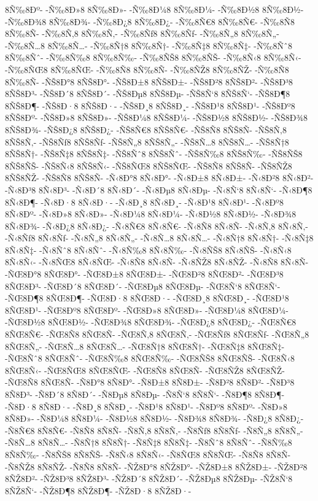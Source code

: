 {8Ñ‰8Ðº-
-Ñ‰8Ð»8
8Ñ‰8Ð»-
-Ñ‰8Ð¼8
8Ñ‰8Ð¼-
-Ñ‰8Ð½8
8Ñ‰8Ð½-
-Ñ‰8Ð¾8
8Ñ‰8Ð¾-
-Ñ‰8Ð¿8
8Ñ‰8Ð¿-
-Ñ‰8Ñ€8
8Ñ‰8Ñ€-
-Ñ‰8Ñ8
8Ñ‰8Ñ-
-Ñ‰8Ñ‚8
8Ñ‰8Ñ‚-
-Ñ‰8Ñƒ8
8Ñ‰8Ñƒ-
-Ñ‰8Ñ„8
8Ñ‰8Ñ„-
-Ñ‰8Ñ…8
8Ñ‰8Ñ…-
-Ñ‰8Ñ†8
8Ñ‰8Ñ†-
-Ñ‰8Ñ‡8
8Ñ‰8Ñ‡-
-Ñ‰8Ñˆ8
8Ñ‰8Ñˆ-
-Ñ‰8Ñ‰8
8Ñ‰8Ñ‰-
-Ñ‰8ÑŠ8
8Ñ‰8ÑŠ-
-Ñ‰8Ñ‹8
8Ñ‰8Ñ‹-
-Ñ‰8ÑŒ8
8Ñ‰8ÑŒ-
-Ñ‰8Ñ8
8Ñ‰8Ñ-
-Ñ‰8ÑŽ8
8Ñ‰8ÑŽ-
-Ñ‰8Ñ8
8Ñ‰8Ñ-
-ÑŠ8Ð°8
8ÑŠ8Ð°-
-ÑŠ8Ð±8
8ÑŠ8Ð±-
-ÑŠ8Ð²8
8ÑŠ8Ð²-
-ÑŠ8Ð³8
8ÑŠ8Ð³-
-ÑŠ8Ð´8
8ÑŠ8Ð´-
-ÑŠ8Ðµ8
8ÑŠ8Ðµ-
-ÑŠ8Ñ‘8
8ÑŠ8Ñ‘-
-ÑŠ8Ð¶8
8ÑŠ8Ð¶-
-ÑŠ8Ð·8
8ÑŠ8Ð·-
-ÑŠ8Ð¸8
8ÑŠ8Ð¸-
-ÑŠ8Ð¹8
8ÑŠ8Ð¹-
-ÑŠ8Ðº8
8ÑŠ8Ðº-
-ÑŠ8Ð»8
8ÑŠ8Ð»-
-ÑŠ8Ð¼8
8ÑŠ8Ð¼-
-ÑŠ8Ð½8
8ÑŠ8Ð½-
-ÑŠ8Ð¾8
8ÑŠ8Ð¾-
-ÑŠ8Ð¿8
8ÑŠ8Ð¿-
-ÑŠ8Ñ€8
8ÑŠ8Ñ€-
-ÑŠ8Ñ8
8ÑŠ8Ñ-
-ÑŠ8Ñ‚8
8ÑŠ8Ñ‚-
-ÑŠ8Ñƒ8
8ÑŠ8Ñƒ-
-ÑŠ8Ñ„8
8ÑŠ8Ñ„-
-ÑŠ8Ñ…8
8ÑŠ8Ñ…-
-ÑŠ8Ñ†8
8ÑŠ8Ñ†-
-ÑŠ8Ñ‡8
8ÑŠ8Ñ‡-
-ÑŠ8Ñˆ8
8ÑŠ8Ñˆ-
-ÑŠ8Ñ‰8
8ÑŠ8Ñ‰-
-ÑŠ8ÑŠ8
8ÑŠ8ÑŠ-
-ÑŠ8Ñ‹8
8ÑŠ8Ñ‹-
-ÑŠ8ÑŒ8
8ÑŠ8ÑŒ-
-ÑŠ8Ñ8
8ÑŠ8Ñ-
-ÑŠ8ÑŽ8
8ÑŠ8ÑŽ-
-ÑŠ8Ñ8
8ÑŠ8Ñ-
-Ñ‹8Ð°8
8Ñ‹8Ð°-
-Ñ‹8Ð±8
8Ñ‹8Ð±-
-Ñ‹8Ð²8
8Ñ‹8Ð²-
-Ñ‹8Ð³8
8Ñ‹8Ð³-
-Ñ‹8Ð´8
8Ñ‹8Ð´-
-Ñ‹8Ðµ8
8Ñ‹8Ðµ-
-Ñ‹8Ñ‘8
8Ñ‹8Ñ‘-
-Ñ‹8Ð¶8
8Ñ‹8Ð¶-
-Ñ‹8Ð·8
8Ñ‹8Ð·-
-Ñ‹8Ð¸8
8Ñ‹8Ð¸-
-Ñ‹8Ð¹8
8Ñ‹8Ð¹-
-Ñ‹8Ðº8
8Ñ‹8Ðº-
-Ñ‹8Ð»8
8Ñ‹8Ð»-
-Ñ‹8Ð¼8
8Ñ‹8Ð¼-
-Ñ‹8Ð½8
8Ñ‹8Ð½-
-Ñ‹8Ð¾8
8Ñ‹8Ð¾-
-Ñ‹8Ð¿8
8Ñ‹8Ð¿-
-Ñ‹8Ñ€8
8Ñ‹8Ñ€-
-Ñ‹8Ñ8
8Ñ‹8Ñ-
-Ñ‹8Ñ‚8
8Ñ‹8Ñ‚-
-Ñ‹8Ñƒ8
8Ñ‹8Ñƒ-
-Ñ‹8Ñ„8
8Ñ‹8Ñ„-
-Ñ‹8Ñ…8
8Ñ‹8Ñ…-
-Ñ‹8Ñ†8
8Ñ‹8Ñ†-
-Ñ‹8Ñ‡8
8Ñ‹8Ñ‡-
-Ñ‹8Ñˆ8
8Ñ‹8Ñˆ-
-Ñ‹8Ñ‰8
8Ñ‹8Ñ‰-
-Ñ‹8ÑŠ8
8Ñ‹8ÑŠ-
-Ñ‹8Ñ‹8
8Ñ‹8Ñ‹-
-Ñ‹8ÑŒ8
8Ñ‹8ÑŒ-
-Ñ‹8Ñ8
8Ñ‹8Ñ-
-Ñ‹8ÑŽ8
8Ñ‹8ÑŽ-
-Ñ‹8Ñ8
8Ñ‹8Ñ-
-ÑŒ8Ð°8
8ÑŒ8Ð°-
-ÑŒ8Ð±8
8ÑŒ8Ð±-
-ÑŒ8Ð²8
8ÑŒ8Ð²-
-ÑŒ8Ð³8
8ÑŒ8Ð³-
-ÑŒ8Ð´8
8ÑŒ8Ð´-
-ÑŒ8Ðµ8
8ÑŒ8Ðµ-
-ÑŒ8Ñ‘8
8ÑŒ8Ñ‘-
-ÑŒ8Ð¶8
8ÑŒ8Ð¶-
-ÑŒ8Ð·8
8ÑŒ8Ð·-
-ÑŒ8Ð¸8
8ÑŒ8Ð¸-
-ÑŒ8Ð¹8
8ÑŒ8Ð¹-
-ÑŒ8Ðº8
8ÑŒ8Ðº-
-ÑŒ8Ð»8
8ÑŒ8Ð»-
-ÑŒ8Ð¼8
8ÑŒ8Ð¼-
-ÑŒ8Ð½8
8ÑŒ8Ð½-
-ÑŒ8Ð¾8
8ÑŒ8Ð¾-
-ÑŒ8Ð¿8
8ÑŒ8Ð¿-
-ÑŒ8Ñ€8
8ÑŒ8Ñ€-
-ÑŒ8Ñ8
8ÑŒ8Ñ-
-ÑŒ8Ñ‚8
8ÑŒ8Ñ‚-
-ÑŒ8Ñƒ8
8ÑŒ8Ñƒ-
-ÑŒ8Ñ„8
8ÑŒ8Ñ„-
-ÑŒ8Ñ…8
8ÑŒ8Ñ…-
-ÑŒ8Ñ†8
8ÑŒ8Ñ†-
-ÑŒ8Ñ‡8
8ÑŒ8Ñ‡-
-ÑŒ8Ñˆ8
8ÑŒ8Ñˆ-
-ÑŒ8Ñ‰8
8ÑŒ8Ñ‰-
-ÑŒ8ÑŠ8
8ÑŒ8ÑŠ-
-ÑŒ8Ñ‹8
8ÑŒ8Ñ‹-
-ÑŒ8ÑŒ8
8ÑŒ8ÑŒ-
-ÑŒ8Ñ8
8ÑŒ8Ñ-
-ÑŒ8ÑŽ8
8ÑŒ8ÑŽ-
-ÑŒ8Ñ8
8ÑŒ8Ñ-
-Ñ8Ð°8
8Ñ8Ð°-
-Ñ8Ð±8
8Ñ8Ð±-
-Ñ8Ð²8
8Ñ8Ð²-
-Ñ8Ð³8
8Ñ8Ð³-
-Ñ8Ð´8
8Ñ8Ð´-
-Ñ8Ðµ8
8Ñ8Ðµ-
-Ñ8Ñ‘8
8Ñ8Ñ‘-
-Ñ8Ð¶8
8Ñ8Ð¶-
-Ñ8Ð·8
8Ñ8Ð·-
-Ñ8Ð¸8
8Ñ8Ð¸-
-Ñ8Ð¹8
8Ñ8Ð¹-
-Ñ8Ðº8
8Ñ8Ðº-
-Ñ8Ð»8
8Ñ8Ð»-
-Ñ8Ð¼8
8Ñ8Ð¼-
-Ñ8Ð½8
8Ñ8Ð½-
-Ñ8Ð¾8
8Ñ8Ð¾-
-Ñ8Ð¿8
8Ñ8Ð¿-
-Ñ8Ñ€8
8Ñ8Ñ€-
-Ñ8Ñ8
8Ñ8Ñ-
-Ñ8Ñ‚8
8Ñ8Ñ‚-
-Ñ8Ñƒ8
8Ñ8Ñƒ-
-Ñ8Ñ„8
8Ñ8Ñ„-
-Ñ8Ñ…8
8Ñ8Ñ…-
-Ñ8Ñ†8
8Ñ8Ñ†-
-Ñ8Ñ‡8
8Ñ8Ñ‡-
-Ñ8Ñˆ8
8Ñ8Ñˆ-
-Ñ8Ñ‰8
8Ñ8Ñ‰-
-Ñ8ÑŠ8
8Ñ8ÑŠ-
-Ñ8Ñ‹8
8Ñ8Ñ‹-
-Ñ8ÑŒ8
8Ñ8ÑŒ-
-Ñ8Ñ8
8Ñ8Ñ-
-Ñ8ÑŽ8
8Ñ8ÑŽ-
-Ñ8Ñ8
8Ñ8Ñ-
-ÑŽ8Ð°8
8ÑŽ8Ð°-
-ÑŽ8Ð±8
8ÑŽ8Ð±-
-ÑŽ8Ð²8
8ÑŽ8Ð²-
-ÑŽ8Ð³8
8ÑŽ8Ð³-
-ÑŽ8Ð´8
8ÑŽ8Ð´-
-ÑŽ8Ðµ8
8ÑŽ8Ðµ-
-ÑŽ8Ñ‘8
8ÑŽ8Ñ‘-
-ÑŽ8Ð¶8
8ÑŽ8Ð¶-
-ÑŽ8Ð·8
8ÑŽ8Ð·-
}
